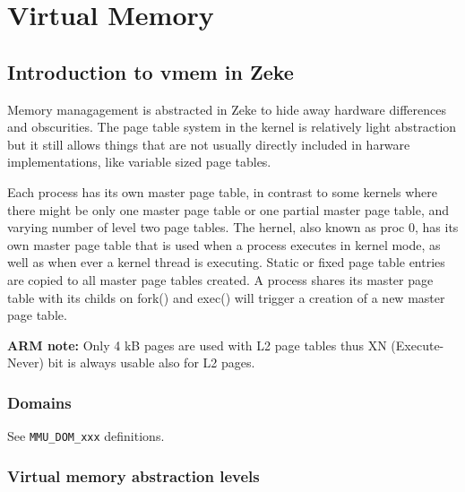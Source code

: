 \chapter{Virtual Memory}

\section{Introduction to vmem in Zeke}

Memory managagement is abstracted in Zeke to hide away hardware differences
and obscurities. The page table system in the kernel is relatively light
abstraction but it still allows things that are not usually directly included
in harware implementations, like variable sized page tables.

Each process has its own master page table, in contrast to some kernels where
there might be only one master page table or one partial master page table,
and varying number of level two page tables. The hernel, also known as proc 0,
has its own master page table that is used when a process executes in kernel
mode, as well as when ever a kernel thread is executing. Static or fixed
page table entries are copied to all master page tables created.
A process shares its master page table with its childs on fork() and
exec() will trigger a creation of a new master page table.

\textbf{ARM note:} Only 4 kB pages are used with L2 page tables thus
XN (Execute-Never) bit is always usable also for L2 pages.

\subsection{Domains}

See \verb+MMU_DOM_xxx+ definitions.

\subsection{Virtual memory abstraction levels}

